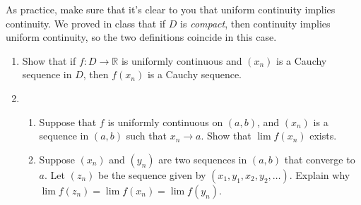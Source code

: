 \documentclass[letterpaper,12pt]{article}
\newcommand{\R}{\mathbb{R}}
\begin{document}
As practice, make sure that it's clear to you that uniform continuity implies continuity. We proved in class that if $D$ is {\em compact}, then continuity implies uniform continuity, so the two definitions coincide in this case. 
\begin{enumerate}
 \item Show that if $f:D\to\R$ is uniformly continuous and $(x_n)$ is a Cauchy sequence in $D$, then $f(x_n)$ is a Cauchy sequence.
 \item \begin{enumerate}
        \item Suppose that $f$ is uniformly continuous on $(a,b)$, and $(x_n)$ is a sequence in $(a,b)$ such that $x_n\to a$. Show that $\lim f(x_n)$ exists.
	\item Suppose $(x_n)$ and $(y_n)$ are two sequences in $(a,b)$ that converge to $a$. Let $(z_n)$ be the sequence given by $(x_1,y_1,x_2,y_2,\ldots)$. Explain why $\lim f(z_n) = \lim f(x_n) = \lim f(y_n)$.


\end{enumerate}
\end{enumerate}
\end{document}
